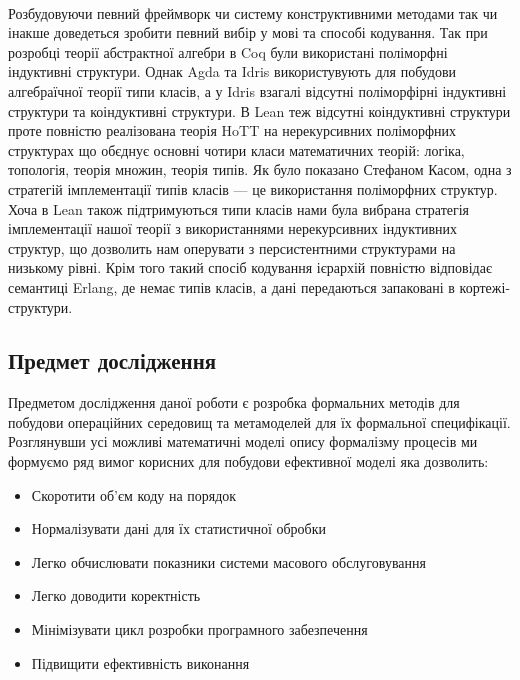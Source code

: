 \documentclass[11pt,oneside]{article}
\begin{document}
   \paragraph{}
   Розбудовуючи певний фреймворк чи систему конструктивними методами
   так чи інакше доведеться зробити певний вибір у мові та способі кодування.
   Так при розробці теорії абстрактної алгебри в Coq були використані
   поліморфні індуктивні структури\cite{coqalg}. Однак Agda та Idris використувують
   для побудови алгебраїчної теорії типи класів, а у Idris взагалі відсутні
   поліморфірні індуктивні структури та коіндуктивні структури. В Lean
   теж відсутні коіндуктивні структури проте повністю реалізована теорія
   HoTT на нерекурсивних поліморфних структурах що обєднує основні чотири
   класи математичних теорій: логіка, топологія, теорія множин, теорія типів.
   Як було показано Стефаном Касом\cite{kaes}, одна з
   стратегій імплементації типів класів --- це використання поліморфних структур.
   Хоча в Lean також підтримуються типи класів нами була вибрана стратегія
   імплементації нашої теорії з використаннями нерекурсивних індуктивних структур,
   що дозволить нам оперувати з персистентними структурами на низькому рівні.
   Крім того такий спосіб кодування ієрархій повністю відповідає семантиці Erlang,
   де немає типів класів, а дані передаються запаковані в кортежі-структури.


\subsection{Предмет дослідження}
\vspace{0.5cm}

   Предметом дослідження даної роботи є розробка формальних методів для побудови
   операційних середовищ та метамоделей для їх формальної специфікації. Розглянувши усі
   можливі математичні моделі опису формалізму процесів ми формуємо ряд вимог корисних
   для побудови ефективної моделі яка дозволить:

\begin{itemize}
   \item Скоротити об’єм коду на порядок
   \item Нормалізувати дані для їх статистичної обробки
   \item Легко обчислювати показники системи масового обслуговування
   \item Легко доводити коректність
   \item Мінімізувати цикл розробки програмного забезпечення
   \item Підвищити ефективність виконання
\end{itemize}
\end{document}
